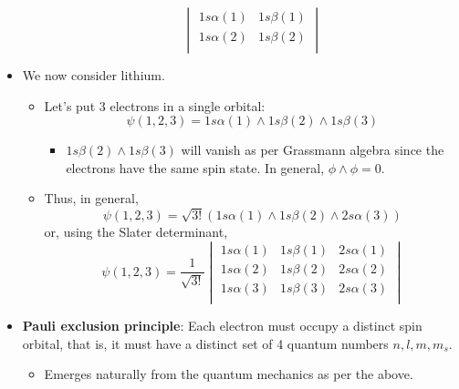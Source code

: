 \documentclass[../notes.tex]{subfiles}
\begin{document}
\begin{itemize}
\begin{itemize}
\begin{equation*}
            \begin{vmatrix}
                1s\alpha(1) & 1s\beta(1)\\
                1s\alpha(2) & 1s\beta(2)\\
            \end{vmatrix}
        \end{equation*}
    \end{itemize}
    \item We now consider lithium.
    \begin{itemize}
        \item Let's put 3 electrons in a single orbital:
        \begin{equation*}
            \psi(1,2,3) = 1s\alpha(1)\wedge 1s\beta(2)\wedge 1s\beta(3)
        \end{equation*}
        \begin{itemize}
            \item $1s\beta(2)\wedge 1s\beta(3)$ will vanish as per Grassmann algebra since the electrons have the same spin state. In general, $\phi\wedge\phi=0$.
        \end{itemize}
        \item Thus, in general,
        \begin{equation*}
            \psi(1,2,3) = \sqrt{3!}(1s\alpha(1)\wedge 1s\beta(2)\wedge 2s\alpha(3))
        \end{equation*}
        or, using the Slater determinant,
        \begin{equation*}
            \psi(1,2,3) = \frac{1}{\sqrt{3!}}
            \begin{vmatrix}
                1s\alpha(1) & 1s\beta(1) & 2s\alpha(1)\\
                1s\alpha(2) & 1s\beta(2) & 2s\alpha(2)\\
                1s\alpha(3) & 1s\beta(3) & 2s\alpha(3)\\
            \end{vmatrix}
        \end{equation*}
    \end{itemize}
    \item \textbf{Pauli exclusion principle}: Each electron must occupy a distinct spin orbital, that is, it must have a distinct set of 4 quantum numbers $n,l,m,m_s$.
    \begin{itemize}
        \item Emerges naturally from the quantum mechanics as per the above.
    \end{itemize}

\end{itemize}
\end{document}
